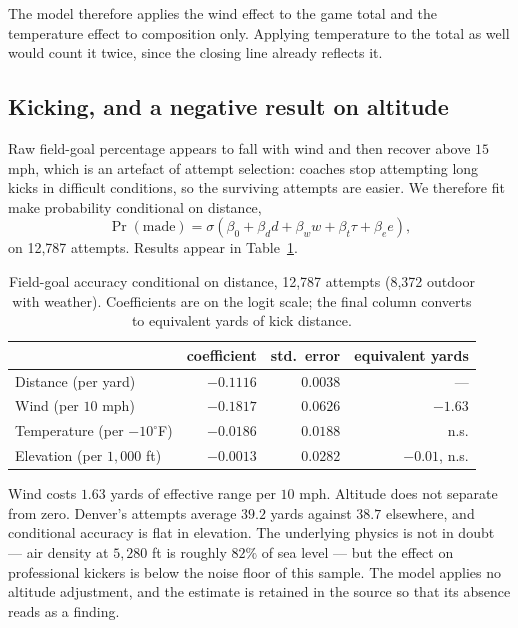 \documentclass[11pt,a4paper]{article}
\begin{document}
The model therefore applies the wind effect to the game total and the
temperature effect to composition only. Applying temperature to the total as
well would count it twice, since the closing line already reflects it.

\subsection{Kicking, and a negative result on altitude}

Raw field-goal percentage appears to fall with wind and then recover above
$15$ mph, which is an artefact of attempt selection: coaches stop attempting
long kicks in difficult conditions, so the surviving attempts are easier. We
therefore fit make probability conditional on distance,
\begin{equation}
\Pr(\text{made}) = \sigma\!\left(\beta_0 + \beta_d d + \beta_w w + \beta_t \tau + \beta_e e\right),
\end{equation}
on 12{,}787 attempts. Results appear in Table~\ref{tab:kick}.

\begin{table}[t]
\centering
\caption{Field-goal accuracy conditional on distance, 12{,}787 attempts
(8{,}372 outdoor with weather). Coefficients are on the logit scale; the final
column converts to equivalent yards of kick distance.}
\label{tab:kick}
\begin{tabular}{lrrr}
\toprule
& coefficient & std.\ error & equivalent yards \\
\midrule
Distance (per yard)      & $-0.1116$ & $0.0038$ & --- \\
Wind (per $10$ mph)      & $-0.1817$ & $0.0626$ & $-1.63$ \\
Temperature (per $-10^\circ$F) & $-0.0186$ & $0.0188$ & n.s. \\
Elevation (per $1{,}000$ ft)   & $-0.0013$ & $0.0282$ & $-0.01$, n.s. \\
\bottomrule
\end{tabular}
\end{table}

Wind costs $1.63$ yards of effective range per $10$ mph. Altitude does not
separate from zero. Denver's attempts average $39.2$ yards against $38.7$
elsewhere, and conditional accuracy is flat in elevation. The underlying physics
is not in doubt --- air density at $5{,}280$ ft is roughly $82\%$ of sea level
--- but the effect on professional kickers is below the noise floor of this
sample. The model applies no altitude adjustment, and the estimate is retained
in the source so that its absence reads as a finding.
\end{document}
